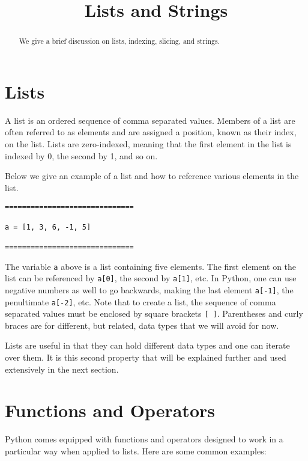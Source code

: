\documentclass{ximera}
\title{Lists and Strings}
\begin{document}
  
\begin{abstract}  
We give a brief discussion on lists, indexing, slicing, and strings.
\end{abstract}  
\maketitle

\section{Lists}

A list is an ordered sequence of comma separated values. Members of a list are often referred to as elements and are assigned a position, known as their index, on the list. Lists are zero-indexed, meaning that the first element in the list is indexed by 0, the second by 1, and so on.

Below we give an example of a list and how to reference various elements in the list.

\begin{verbatim}
==============================

a = [1, 3, 6, -1, 5]

==============================
\end{verbatim}

The variable \verb|a| above is a list containing five elements. The first element on the list can be referenced by \verb|a[0]|, the second by \verb|a[1]|, etc. In Python, one can use negative numbers as well to go backwards, making the last element \verb|a[-1]|, the penultimate \verb|a[-2]|, etc. Note that to create a list, the sequence of comma separated values must be enclosed by square brackets \verb|[ ]|. Parentheses and curly braces are for different, but related, data types that we will avoid for now.

Lists are useful in that they can hold different data types and one can iterate over them. It is this second property that will be explained further and used extensively in the next section. 

\section{Functions and Operators}

Python comes equipped with functions and operators designed to work in a particular way when applied to lists. Here are some common examples:
\end{document}
